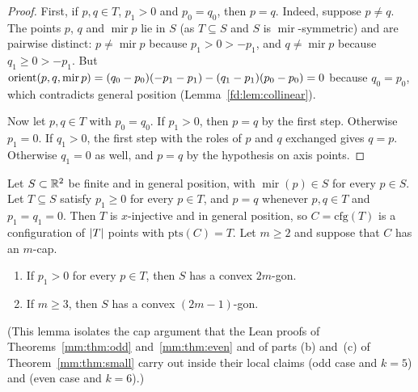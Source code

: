 \begin{proof}
First, if $p,q\in T$, $p_1>0$ and $p_0=q_0$, then $p=q$. Indeed, suppose $p\ne q$. The points $p$, $q$
and $\operatorname{mir}p$ lie in $S$ (as $T\subseteq S$ and $S$ is $\operatorname{mir}$-symmetric) and are
pairwise distinct: $p\ne\operatorname{mir}p$ because $p_1>0>-p_1$, and $q\ne\operatorname{mir}p$ because
$q_1\ge0>-p_1$. But
$\operatorname{orient}(p,q,\operatorname{mir}p)=(q_0-p_0)(-p_1-p_1)-(q_1-p_1)(p_0-p_0)=0$ because $q_0=p_0$, which
contradicts general position (Lemma~\ref{fd:lem:collinear}).

Now let $p,q\in T$ with $p_0=q_0$. If $p_1>0$, then $p=q$ by the first step. Otherwise $p_1=0$. If
$q_1>0$, the first step with the roles of $p$ and $q$ exchanged gives $q=p$. Otherwise $q_1=0$ as well,
and $p=q$ by the hypothesis on axis points.
\end{proof}

\begin{lemma}\label{mm:lem:upper-caps}
Let $S\subset\mathbb R^2$ be finite and in general position, with $\operatorname{mir}(p)\in S$ for every $p\in S$.
Let $T\subseteq S$ satisfy $p_1\ge0$ for every $p\in T$, and $p=q$ whenever $p,q\in T$ and $p_1=q_1=0$.
Then $T$ is $x$-injective and in general position, so $C=\mathrm{cfg}(T)$ is a configuration of
$\lvert T\rvert$ points with $\mathrm{pts}(C)=T$. Let $m\ge2$ and suppose that $C$ has an $m$-cap.
\begin{enumerate}[label=(\alph*)]
\item If $p_1>0$ for every $p\in T$, then $S$ has a convex $2m$-gon.
\item If $m\ge3$, then $S$ has a convex $(2m-1)$-gon.
\end{enumerate}
(This lemma isolates the cap argument that the Lean proofs of Theorems~\ref{mm:thm:odd}
and~\ref{mm:thm:even} and of parts (b) and~(c) of Theorem~\ref{mm:thm:small} carry out inside their local
claims  (odd case and $k=5$) and  (even case and $k=6$).)
\end{lemma}

